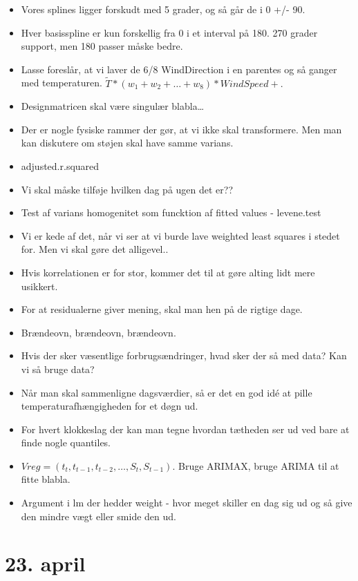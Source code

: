 \begin{itemize}
    \item Vores splines ligger forskudt med 5 grader, og så går de i 0 +/- 90. 
    \item Hver basisspline er kun forskellig fra 0 i et interval på 180. 270 grader support, men 180 passer måske bedre. 
    \item Lasse foreslår, at vi laver de 6/8 WindDirection i en parentes og så ganger med temperaturen. $\tilde T*(w_1 + w_2+\dots+w_8)*WindSpeed + .$
    \item Designmatricen skal være singulær blabla\dots
    \item Der er nogle fysiske rammer der gør, at vi ikke skal transformere. Men man kan diskutere om støjen skal have samme varians. 
    \item adjusted.r.squared 
    \item Vi skal måske tilføje hvilken dag på ugen det er??
    \item Test af varians homogenitet som funcktion af fitted values - levene.test
    \item Vi er kede af det, når vi ser at vi burde lave weighted least squares i stedet for. Men vi skal gøre det alligevel..
    \item Hvis korrelationen er for stor, kommer det til at gøre alting lidt mere usikkert. 
    \item For at residualerne giver mening, skal man hen på de rigtige dage. 
    \item Brændeovn, brændeovn, brændeovn. 
    \item Hvis der sker væsentlige forbrugsændringer, hvad sker der så med data? Kan vi så bruge data? 
    \item Når man skal sammenligne dagsværdier, så er det en god idé at pille temperaturafhængigheden for et døgn ud. 
    \item For hvert klokkeslag der kan man tegne hvordan tætheden ser ud ved bare at finde nogle quantiles. 
    \item $Vreg = (t_t, t_{t-1}, t_{t-2},\dots,S_t, S_{t-1})$. Bruge ARIMAX, bruge ARIMA til at fitte blabla.
    \item Argument i lm der hedder weight - hvor meget skiller en dag sig ud og så give den mindre vægt eller smide den ud. 
\end{itemize}

\pagebreak

\section{23. april}

